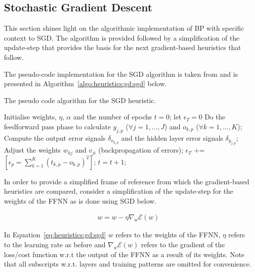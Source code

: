 \subsection{Stochastic Gradient Descent}\label{sec:heuristics:gd:sgd}

This section shines light on the algorithmic implementation of \ac{BP} with specific context to \ac{SGD}. The algorithm is provided followed by a simplification of the update-step that provides the basis for the next gradient-based heuristics that follow.

The pseudo-code implementation for the \ac{SGD} algorithm is taken from \cite{ref:engelbrecht:2007} and is presented in Algorithm~\ref{algo:heuristics:gd:sgd} below.

\begin{algorithm}[H]
      \caption{The pseudo code algorithm for the \ac{SGD} heuristic.}
      \label{algo:heuristics:gd:sgd}
      \begin{algorithmic}
            \State Initialise weights, $\eta$, $\alpha$ and the number of epochs $t=0$;
            let $\epsilon_{T} = 0$
            \State Do the feedforward pass phase to calculate $y_{j,p}$ ($\forall j = 1, \dots, J$) and $o_{k,p}$ ($\forall k = 1, \dots, K$);
            \State Compute the output error signals $\delta_{o_{k,p}}$ and the hidden layer error signals $\delta_{y_{j,p}}$;
            \State Adjust the weights $w_{kj}$ and $v_{ji}$ (backpropagation of errors);
            \State $\epsilon_{T}$ += $[\epsilon_{p} = \sum^{K}_{k=1}(t_{k,p} - o_{k,p})^{2}]$;
            \EndFor
            \State $t = t + 1$;
            \EndWhile
      \end{algorithmic}
\end{algorithm}

In order to provide a simplified frame of reference from which the gradient-based heuristics are compared, consider a simplification of the update-step for the weights of the \ac{FFNN} as is done using \ac{SGD} below.

\begin{equation}
      \label{eq:heuristics:gd:sgd}
      \begin{split}
            w = w - \eta \nabla_{w}\mathcal{E}(w)
      \end{split}
\end{equation}

In Equation~\ref{eq:heuristics:gd:sgd} $w$ refers to the weights of the \ac{FFNN}, $\eta$ refers to the learning rate as before and $\nabla_{w}\mathcal{E}(w)$ refers to the gradient of the loss/cost function w.r.t the output of the \ac{FFNN} as a result of its weights. Note that all subscripts w.r.t. layers and training patterns are omitted for convenience.

